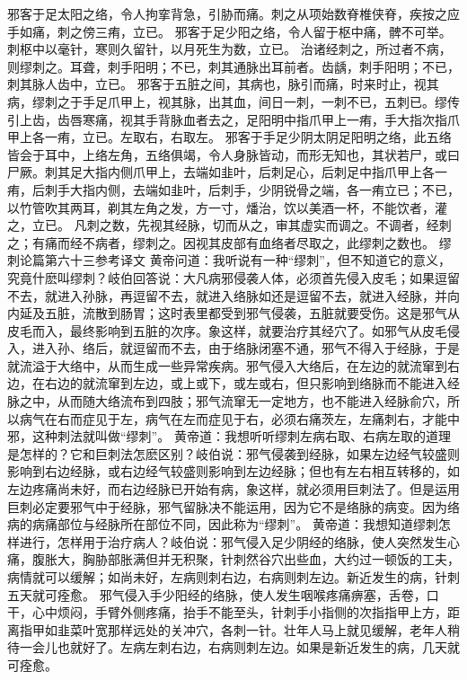 \documentclass[a4paper,12pt,UTF8,twoside]{ctexbook}
\begin{document}
邪客于足太阳之络，令人拘挛背急，引胁而痛。刺之从项始数脊椎侠脊，疾按之应手如痛，刺之傍三痏，立已。
邪客于足少阳之络，令人留于枢中痛，髀不可举。刺枢中以毫针，寒则久留针，以月死生为数，立已。
治诸经刺之，所过者不病，则缪刺之。耳聋，刺手阳明；不已，刺其通脉出耳前者。齿龋，刺手阳明；不已，刺其脉人齿中，立已。
邪客于五脏之间，其病也，脉引而痛，时来时止，视其病，缪刺之于手足爪甲上，视其脉，出其血，间日一刺，一刺不已，五刺已。缪传引上齿，齿唇寒痛，视其手背脉血者去之，足阳明中指爪甲上一痏，手大指次指爪甲上各一痏，立已。左取右，右取左。
邪客于手足少阴太阴足阳明之络，此五络皆会于耳中，上络左角，五络俱竭，令人身脉皆动，而形无知也，其状若尸，或曰尸厥。刺其足大指内侧爪甲上，去端如韭叶，后刺足心，后刺足中指爪甲上各一痏，后刺手大指内侧，去端如韭叶，后刺手，少阴锐骨之端，各一痏立已；不已，以竹管吹其两耳，剃其左角之发，方一寸，燔治，饮以美酒一杯，不能饮者，灌之，立已。
凡刺之数，先视其经脉，切而从之，审其虚实而调之。不调者，经刺之；有痛而经不病者，缪刺之。因视其皮部有血络者尽取之，此缪刺之数也。
缪刺论篇第六十三参考译文
黄帝问道：我听说有一种“缪刺”，但不知道它的意义，究竟什麽叫缪刺？岐伯回答说：大凡病邪侵袭人体，必须首先侵入皮毛；如果逗留不去，就进入孙脉，再逗留不去，就进入络脉如还是逗留不去，就进入经脉，并向内延及五脏，流散到肠胃；这时表里都受到邪气侵袭，五脏就要受伤。这是邪气从皮毛而入，最终影响到五脏的次序。象这样，就要治疗其经穴了。如邪气从皮毛侵入，进入孙、络后，就逗留而不去，由于络脉闭塞不通，邪气不得入于经脉，于是就流溢于大络中，从而生成一些异常疾病。邪气侵入大络后，在左边的就流窜到右边，在右边的就流窜到左边，或上或下，或左或右，但只影响到络脉而不能进入经脉之中，从而随大络流布到四肢；邪气流窜无一定地方，也不能进入经脉俞穴，所以病气在右而症见于左，病气在左而症见于右，必须右痛茨左，左痛刺右，才能中邪，这种刺法就叫做“缪刺”。
黄帝道：我想听听缪刺左病右取、右病左取的道理是怎样的？它和巨刺法怎麽区别？岐伯说：邪气侵袭到经脉，如果左边经气较盛则影响到右边经脉，或右边经气较盛则影响到左边经脉；但也有左右相互转移的，如左边疼痛尚未好，而右边经脉已开始有病，象这样，就必须用巨刺法了。但是运用巨刺必定要邪气中于经脉，邪气留脉决不能运用，因为它不是络脉的病变。因为络病的病痛部位与经脉所在部位不同，因此称为“缪刺”。
黄帝道：我想知道缪刺怎样进行，怎样用于治疗病人？岐伯说：邪气侵入足少阴经的络脉，使人突然发生心痛，腹胀大，胸胁部胀满但并无积聚，针刺然谷穴出些血，大约过一顿饭的工夫，病情就可以缓解；如尚未好，左病则刺右边，右病则刺左边。新近发生的病，针刺五天就可痊愈。
邪气侵入手少阳经的络脉，使人发生咽喉疼痛痹塞，舌卷，口干，心中烦闷，手臂外侧疼痛，抬手不能至头，针刺手小指侧的次指指甲上方，距离指甲如韭菜叶宽那样远处的关冲穴，各刺一针。壮年人马上就见缓解，老年人稍待一会儿也就好了。左病左刺右边，右病则刺左边。如果是新近发生的病，几天就可痊愈。
\end{document}
